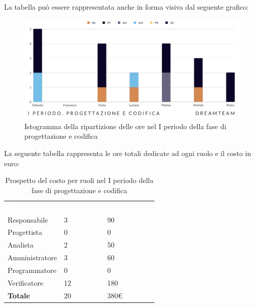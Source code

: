 La tabella può essere rappresentata anche in forma visiva dal seguente grafico:
\begin{figure}[H]
\centering
\includegraphics[scale=0.65]{Sezioni/SezioniPreventivo/grafici/Progettazione_codifica_I_periodo.png}
\caption{Istogramma della ripartizione delle ore nel I periodo della fase di progettazione e codifica}
\end{figure}

La seguente tabella rappresenta le ore totali dedicate ad ogni ruolo e il costo in euro:

\begin{table}[H]
\begin{center}
\renewcommand{\arraystretch}{1.5}
\begin{tabular}{ m{}<{\centering}  m{}<{\centering} m{}<{\centering}}
	\rowcolor{darkblue}
	\textcolor{white}{\textbf{Ruolo}}&\textcolor{white}{\textbf{Totale ore}}&\textcolor{white}{\textbf{Costo totale}}\\ 

	Responsabile  & 3 & 90 \\	
	
	Progettista & 0 & 0 \\
	
	Analista & 2 & 50 \\

	Amministratore & 3 & 60 \\
	
	Programmatore & 0 & 0 \\
	
	Verificatore & 12 & 180 \\
	
	\textbf{Totale} & 20 & 380\euro \\
	
\end{tabular}
\caption{Prospetto del costo per ruoli nel I periodo della fase di progettazione e codifica}
\end{center}
\end{table}

